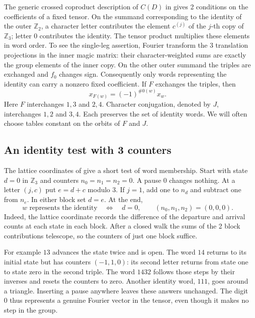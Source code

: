 \documentclass[11pt,a4paper]{amsart}
\begin{document}
The generic crossed coproduct description of $C(D)$ in \cite{bb3,bo} gives 2 conditions on the coefficients of a fixed tensor. On the summand corresponding to the identity of the outer $\mathbb Z_2$, a character letter contributes the element $c^{(j)}$ of the $j$-th copy of $\mathbb Z_3$; letter $0$ contributes the identity. The tensor product multiplies these elements in word order. To see the single-leg assertion, Fourier transform the 3 translation projections in the inner magic matrix: their character-weighted sums are exactly the group elements of the inner copy. On the other outer summand the triples are exchanged and $f_0$ changes sign. Consequently only words representing the identity can carry a nonzero fixed coefficient. If $F$ exchanges the triples, then
\[
 x_{F(w)}=(-1)^{\#0(w)}x_w .
\]
Here $F$ interchanges $1,3$ and $2,4$. Character conjugation, denoted by $J$, interchanges $1,2$ and $3,4$. Each preserves the set of identity words. We will often choose tables constant on the orbits of $F$ and $J$.

\subsection{An identity test with 3 counters}
The lattice coordinates of \cite[Theorem 4.3]{bo} give a short test of word membership. Start with state $d=0$ in $\mathbb Z_3$ and counters $n_0=n_1=n_2=0$. A pause $0$ changes nothing. At a letter $(j,c)$ put $e=d+c$ modulo 3. If $j=1$, add one to $n_d$ and subtract one from $n_e$. In either block set $d=e$. At the end,
\[
 w\text{ represents the identity}\quad\Longleftrightarrow\quad
 d=0,\qquad (n_0,n_1,n_2)=(0,0,0).
\]
Indeed, the lattice coordinate records the difference of the departure and arrival counts at each state in each block. After a closed walk the sums of the 2 block contributions telescope, so the counters of just one block suffice.

For example $13$ advances the state twice and is open. The word $14$ returns to its initial state but has counters $(-1,1,0)$: its second letter returns from state one to state zero in the second triple. The word $1432$ follows those steps by their inverses and resets the counters to zero. Another identity word, $111$, goes around a triangle. Inserting a pause anywhere leaves these answers unchanged. The digit $0$ thus represents a genuine Fourier vector in the tensor, even though it makes no step in the group.
\end{document}
